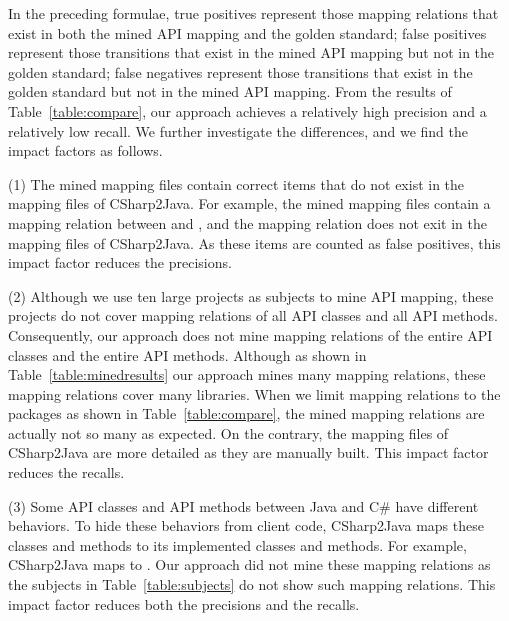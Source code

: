 In the preceding formulae, true positives represent those mapping
relations that exist in both the mined API mapping and the golden
standard; false positives represent those transitions that exist in
the mined API mapping but not in the golden standard; false
negatives represent those transitions that exist in the golden
standard but not in the mined API mapping. From the results of
Table~\ref{table:compare}, our approach achieves a relatively high
precision and a relatively low recall. We further investigate the
differences, and we find the impact factors as follows.

(1) The mined mapping files contain correct items that do not exist
in the mapping files of CSharp2Java. For example, the mined mapping
files contain a mapping relation between 
and , and the mapping relation does
not exit in the mapping files of CSharp2Java. As these items are
counted as false positives, this impact factor reduces the
precisions.

(2) Although we use ten large projects as subjects to mine API
mapping, these projects do not cover mapping relations of all API
classes and all API methods. Consequently, our approach does not
mine mapping relations of the entire API classes and the entire API
methods. Although as shown in Table~\ref{table:minedresults} our
approach mines many mapping relations, these mapping relations cover
many libraries. When we limit mapping relations to the packages as
shown in Table~\ref{table:compare}, the mined mapping relations are
actually not so many as expected. On the contrary, the mapping files
of CSharp2Java are more detailed as they are manually built. This
impact factor reduces the recalls.

(3) Some API classes and API methods between Java and C\# have
different behaviors. To hide these behaviors from client code,
CSharp2Java maps these classes and methods to its implemented
classes and methods. For example, CSharp2Java maps
 to
. Our approach did not
mine these mapping relations as the subjects in
Table~\ref{table:subjects} do not show such mapping relations. This
impact factor reduces both the precisions and the recalls.

